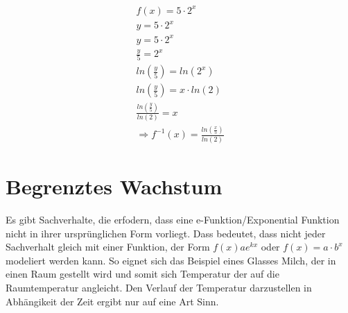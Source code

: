 \begin{beispiel}
	\begin{align*}
		f(x)=5\cdot2^x\tag{$f(x)$ zu $y$ umschreiben}\\
		y=5\cdot2^x\tag{Umformen nach $x$}\\
		y=5\cdot 2^x\tag{Dividieren von $5$}\\
		\frac{y}{5}=2^x\tag{Logarithmieren}\\
		ln\left(\frac{y}{5}\right)=ln(2^x)\tag{3. Logarithmusgesetz}\\
		ln\left(\frac{y}{5}\right)=x\cdot ln(2)\tag{Dividieren $ln(2)$}\\
		\frac{ln\left(\frac{y}{5}\right)}{ln(2)}=x\\
		\Rightarrow f^{-1}(x)=\frac{ln\left(\frac{x}{5}\right)}{ln(2)}
		\end{align*}
\end{beispiel}
\section{Begrenztes Wachstum}
Es gibt Sachverhalte, die erfodern, dass eine e-Funktion/Exponential Funktion nicht in ihrer ursprünglichen Form vorliegt. Dass bedeutet, dass nicht jeder Sachverhalt gleich mit einer Funktion, der Form $f(x)ae^{kx}$ oder $f(x)=a\cdot b^x$ modeliert werden kann. So eignet sich das  Beispiel eines Glasses Milch, der in einen Raum gestellt wird und somit sich Temperatur der auf die Raumtemperatur angleicht. Den Verlauf der Temperatur darzustellen in Abhängikeit der Zeit ergibt nur auf eine Art Sinn.

